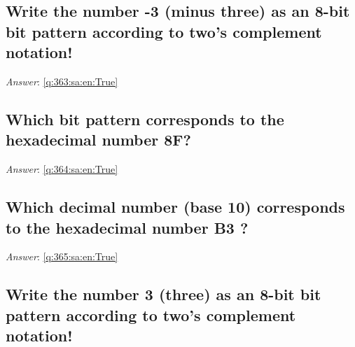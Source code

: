 \documentclass[a4paper,11pt,oneside]{article}
\begin{document}
\begin{sloppypar}
\subsection{Write the number -3 (minus three) as an 8-bit bit pattern according to two's complement notation!}

\label{q:363:sa:en:False}

\vspace{2cm}

\noindent\makebox[\textwidth]{\hrulefill}

\vspace{1cm}

\textit{Answer}: \autoref{q:363:sa:en:True}



\subsection{Which bit pattern corresponds to the hexadecimal number 8F?}

\label{q:364:sa:en:False}

\vspace{2cm}

\noindent\makebox[\textwidth]{\hrulefill}

\vspace{1cm}

\textit{Answer}: \autoref{q:364:sa:en:True}



\subsection{Which decimal number (base 10) corresponds to the hexadecimal number  B3 ?}

\label{q:365:sa:en:False}

\vspace{2cm}

\noindent\makebox[\textwidth]{\hrulefill}

\vspace{1cm}

\textit{Answer}: \autoref{q:365:sa:en:True}



\subsection{Write the number 3 (three) as an 8-bit bit pattern according to two's complement notation!}

\label{q:366:sa:en:False}


\end{sloppypar}
\end{document}
